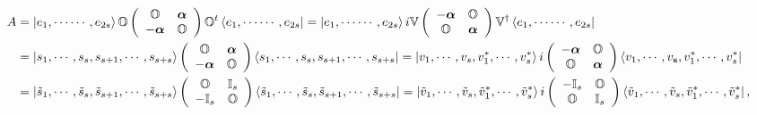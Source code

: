 \documentclass[aps,preprint]{revtex4}%
\begin{document}
\begin{align}
A  &  =\left\vert e_{1},\cdots\cdots,e_{2s}\right\rangle \mathbb{O}\left(
\begin{array}
[c]{cc}%
\mathbb{O} & \boldsymbol{\alpha}\\
-\boldsymbol{\alpha} & \mathbb{O}%
\end{array}
\right)  \mathbb{O}^{t}\left\langle e_{1},\cdots\cdots,e_{2s}\right\vert
=\left\vert e_{1},\cdots\cdots,e_{2s}\right\rangle i\mathbb{V}\left(
\begin{array}
[c]{cc}%
-\boldsymbol{\alpha} & \mathbb{O}\\
\mathbb{O} & \boldsymbol{\alpha}%
\end{array}
\right)  \mathbb{V}^{\dagger}\left\langle e_{1},\cdots\cdots,e_{2s}\right\vert
\\
&  =\left\vert s_{1},\cdots,s_{s},s_{s+1},\cdots,s_{s+s}\right\rangle \left(
\begin{array}
[c]{cc}%
\mathbb{O} & \boldsymbol{\alpha}\\
-\boldsymbol{\alpha} & \mathbb{O}%
\end{array}
\right)  \left\langle s_{1},\cdots,s_{s},s_{s+1},\cdots,s_{s+s}\right\vert
=\left\vert v_{1},\cdots,v_{s},v_{1}^{\ast},\cdots,v_{s}^{\ast}\right\rangle
i\left(
\begin{array}
[c]{cc}%
-\boldsymbol{\alpha} & \mathbb{O}\\
\mathbb{O} & \boldsymbol{\alpha}%
\end{array}
\right)  \left\langle v_{1},\cdots,v_{\mathbf{s}},v_{1}^{\ast},\cdots
,v_{s}^{\ast}\right\vert \\
&  =\left\vert \tilde{s}_{1},\cdots,\tilde{s}_{s},\tilde{s}_{s+1}%
,\cdots,\tilde{s}_{s+s}\right\rangle \left(
\begin{array}
[c]{cc}%
\mathbb{O} & \mathbb{I}_{s}\\
-\mathbb{I}_{s} & \mathbb{O}%
\end{array}
\right)  \left\langle \tilde{s}_{1},\cdots,\tilde{s}_{s},\tilde{s}%
_{s+1},\cdots,\tilde{s}_{s+s}\right\vert =\left\vert \tilde{v}_{1}%
,\cdots,\tilde{v}_{s},\tilde{v}_{1}^{\ast},\cdots,\tilde{v}_{s}^{\ast
}\right\rangle i\left(
\begin{array}
[c]{cc}%
-\mathbb{I}_{s} & \mathbb{O}\\
\mathbb{O} & \mathbb{I}_{s}%
\end{array}
\right)  \left\langle \tilde{v}_{1},\cdots,\tilde{v}_{s},\tilde{v}_{1}^{\ast
},\cdots,\tilde{v}_{s}^{\ast}\right\vert ,
\end{align}
\end{document}
